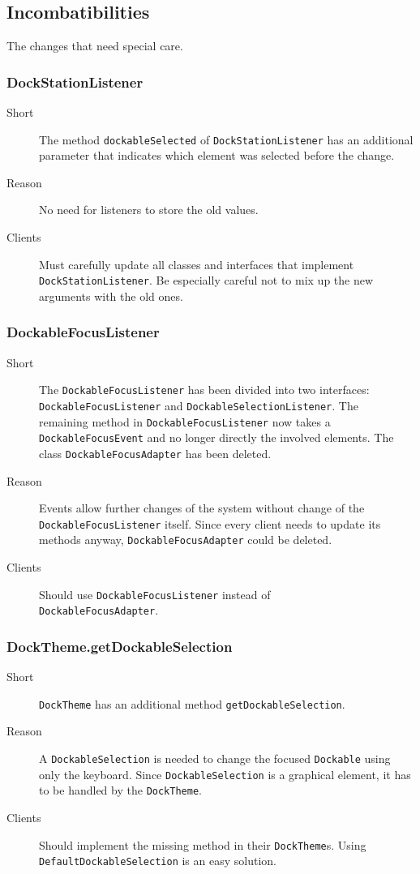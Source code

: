 \documentclass[a4paper,10pt]{article}
\newcommand{\src}[1]{\lstinline[basicstyle=\normalsize\ttfamily,keywordstyle=\normalsize\ttfamily,identifierstyle=\normalsize\ttfamily]|#1|}
\newcommand{\short}{\item[Short]}
\newcommand{\why}{\item[Reason]}
\newcommand{\clients}{\item[Clients]}
\begin{document}
\subsection{Incombatibilities}
The changes that need special care.

\subsubsection{DockStationListener}
\begin{description}
 \short The method \src{dockableSelected} of \src{DockStationListener} has an additional parameter that indicates which element was selected before the change.
 \why No need for listeners to store the old values.
 \clients Must carefully update all classes and interfaces that implement \\\src{DockStationListener}. Be especially careful not to mix up the new arguments with the old ones.
\end{description}

\subsubsection{DockableFocusListener}
\begin{description}
 \short The \src{DockableFocusListener} has been divided into two interfaces: \\\src{DockableFocusListener} and \src{DockableSelectionListener}. The\\remaining method in \src{DockableFocusListener} now takes a \\\src{DockableFocusEvent} and no longer directly the involved elements. The class \src{DockableFocusAdapter} has been deleted.
 \why Events allow further changes of the system without change of the \src{DockableFocusListener} itself. Since every client needs to update its methods anyway, \src{DockableFocusAdapter} could be deleted.
 \clients Should use \src{DockableFocusListener} instead of \\\src{DockableFocusAdapter}.
\end{description}

\subsubsection{DockTheme.getDockableSelection}
\begin{description}
 \short \src{DockTheme} has an additional method \src{getDockableSelection}.
 \why A \src{DockableSelection} is needed to change the focused \src{Dockable} using only the keyboard. Since \src{DockableSelection} is a graphical element, it has to be handled by the \src{DockTheme}.
 \clients Should implement the missing method in their \src{DockTheme}s. Using \src{DefaultDockableSelection} is an easy solution.
\end{description}
\end{document}
